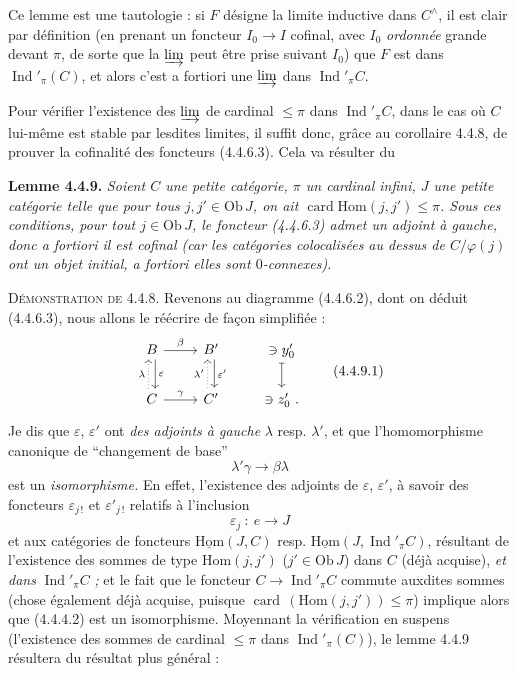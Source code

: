\documentclass[11pt]{article}
\newcommand{\printedpage}[1]{\if\relax\detokenize{#1}\relax\else\marginpar{\footnotesize p.~#1}\fi}
\newcommand{\msp}[1]{\marginpar{\footnotesize [#1]}}
\newcommand{\uHom}{\underline{\mathrm{Hom}}}
\newcommand{\Hom}{\mathrm{Hom}}
\newcommand{\Ob}{\mathrm{Ob}\,}
\newcommand{\card}{\operatorname{card}}
\newcommand{\Ind}{\operatorname{Ind}}
\begin{document}
\msp{page 89}
Ce lemme est une tautologie : si $F$ désigne la limite inductive dans $C^\wedge$, il est clair par définition (en prenant un foncteur $I_0 \longrightarrow I$ cofinal, avec $I_0$ \textit{ordonnée} grande devant $\pi$, de sorte que la $\varinjlim$ peut être prise suivant $I_0$) que $F$ est dans $\Ind'_\pi(C)$, et alors c'est a fortiori une $\varinjlim$ dans $\Ind'_\pi C$.

Pour vérifier l'existence des $\varinjlim$ de cardinal $\leqslant \pi$ dans $\Ind'_\pi C$, dans le cas où $C$ lui-même est stable par lesdites limites, il suffit donc, grâce au corollaire 4.4.8, de prouver la cofinalité des foncteurs (4.4.6.3). Cela va résulter du

\textbf{Lemme 4.4.9.} \textit{Soient $C$ une petite catégorie, $\pi$ un cardinal infini, $J$ une petite catégorie telle que pour tous $j, j' \in \Ob J$, on ait $\card \Hom(j,j') \leqslant \pi$. Sous ces conditions, pour tout $j \in \Ob J$, le foncteur (4.4.6.3) \textup{admet un adjoint à gauche,} donc a fortiori il est cofinal (car les catégories colocalisées au dessus de $C/\varphi(j)$ ont un objet initial, a fortiori elles sont $0$-connexes).}

\msp{page 90}
\textsc{Démonstration de} 4.4.8. Revenons au diagramme (4.4.6.2), dont on déduit (4.4.6.3), nous allons le réécrire de façon simplifiée :
\[
\begin{tikzcd}
B \arrow[r, "\beta"] \arrow[d, shift left, "\varepsilon"] & B' \arrow[d, shift left, "\varepsilon'"] & \ni y'_0 \arrow[d, mapsto] \\
C \arrow[r, "\gamma"] \arrow[u, dotted, shift left, "\lambda"] & C' \arrow[u, dotted, shift left, "\lambda'"] & \ni z'_0\ .
\end{tikzcd}
\tag*{(4.4.9.1)}
\]
Je dis que $\varepsilon$, $\varepsilon'$ ont \textit{des adjoints à gauche} $\lambda$ resp. $\lambda'$, et que l'homomorphisme canonique de “changement de base”
\[
\lambda'\gamma \longrightarrow \beta\lambda \tag*{(4.4.9.2)}
\]
est un \textit{isomorphisme.} En effet, l'existence des adjoints de $\varepsilon$, $\varepsilon'$, à savoir des foncteurs $\varepsilon_{j\,!}$ et $\varepsilon'_{j\,!}$ relatifs à l'inclusion
\[
\varepsilon_j \ :\ e \longrightarrow J
\]
et aux catégories de foncteurs $\uHom(J,C)$ resp. $\uHom(J,\Ind'_\pi C)$, résultant de l'existence des sommes de type $\Hom(j,j')$ ($j' \in \Ob J$) dans $C$ (déjà acquise), \textit{et dans} $\Ind'_\pi C$\textit{ ;} et le fait que le foncteur $C \longrightarrow \Ind'_\pi C$ commute
\msp{page 91}
auxdites sommes (chose également déjà acquise, puisque $\card\, (\Hom(j,j')) \leqslant \pi$) implique alors que (4.4.4.2) est un isomorphisme. Moyennant la vérification en suspens (l'existence %
\printedpage{22}
des sommes de cardinal $\leqslant \pi$ dans $\Ind'_\pi(C)$), le lemme 4.4.9 résultera du résultat plus général :
\end{document}
